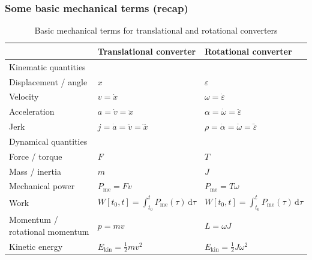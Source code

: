 \begin{frame}
	\frametitle{Some basic mechanical terms (recap)}
	\vspace{-0.15cm}
	\begin{table}
		\centering
		\begin{tabular}{lll}
			& Translational converter & Rotational converter \\
			\toprule
			Kinematic quantities & & \\
			
			Displacement / angle & $x$ & $\varepsilon$ \\
			Velocity & $v=\dot{x}$ & $\omega=\dot{\varepsilon}$ \\
			Acceleration & $a=\dot{v}=\ddot{x}$ & $\alpha=\dot{\omega}=\ddot{\varepsilon}$ \\
			Jerk & $j=\dot{a}=\ddot{v}=\dddot{x}$ & $\rho=\dot{\alpha}=\ddot{\omega}=\dddot{\varepsilon}$ \\
			\midrule
			Dynamical quantities & & \\
			Force / torque & $F$ & $T$ \\
			Mass / inertia & $m$ & $J$ \\
			\midrule
			Mechanical power & $P_\mathrm{me}=F v$ & $P_\mathrm{me}=T \omega$ \\
			Work & $W[t_0,t]=\int_{t_0}^t P_\mathrm{me}(\tau)\,\mathrm{d}\tau$ & $W[t_0,t]=\int_{t_0}^t P_\mathrm{me}(\tau)\,\mathrm{d}\tau$ \\
			Momentum / rotational momentum & $p = m v$ & $L = \omega J$ \\
			Kinetic energy & $E_\mathrm{kin} = \frac{1}{2} m v^2$ & $E_\mathrm{kin} = \frac{1}{2} J \omega^2$ \\
			\bottomrule
		\end{tabular}
		\caption{Basic mechanical terms for translational and rotational converters}
		\label{tab:basic_mechanical_terms}
	\end{table}
\end{frame}

